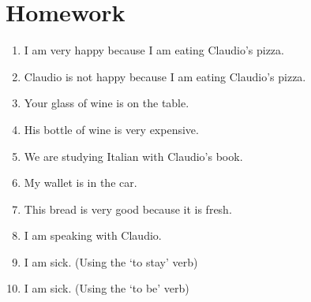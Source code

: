 \section{Homework} \label{0307-Homework}
\begin{enumerate}
    \item I am very happy because I am eating Claudio's pizza. \\
    
    \item Claudio is not happy because I am eating Claudio's pizza. \\
    
    \item Your glass of wine is on the table. \\
    
    \item His bottle of wine is very expensive. \\
    
    \item We are studying Italian with Claudio's book. \\
    
    \item My wallet is in the car. \\
    
    \item This bread is very good because it is fresh. \\
    
    \item I am speaking with Claudio. \\
    
    \item I am sick. (Using the `to stay' verb) \\
    
    \item I am sick. (Using the `to be' verb) \\
\end{enumerate}
